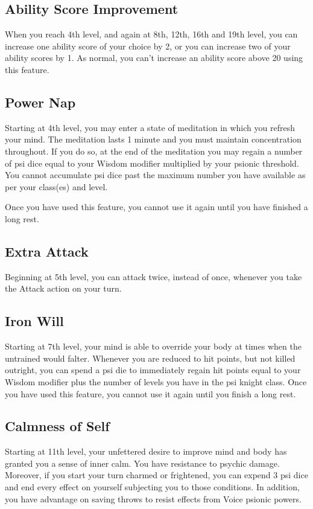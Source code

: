 \subsection{Ability Score Improvement}
When you reach 4th level,
and again at 8th, 12th, 16th and 19th level,
you can increase one ability score of your choice by 2,
or you can increase two of your ability scores by 1.
As normal,
you can't increase an ability score above 20 using this feature.

\subsection{Power Nap}
Starting at 4th level,
you may enter a state of meditation
in which you refresh your mind.
The meditation lasts 1 minute and
you must maintain concentration throughout.
If you do so,
at the end of the meditation you may regain a number of psi dice
equal to your Wisdom modifier multiplied by your psionic threshold.
You cannot accumulate psi dice past the maximum number you have available
as per your class(es) and level.

Once you have used this feature,
you cannot use it again until you have finished a long rest.

\subsection{Extra Attack}
Beginning at 5th level, you can attack twice,
instead of once,
whenever you take the Attack action on your turn.

\subsection{Iron Will}
Starting at 7th level,
your mind is able to override your body at times
when the untrained would falter.
Whenever you are reduced to hit points,
but not killed outright,
you can spend a psi die to immediately regain hit points
equal to your Wisdom modifier plus the number of levels
you have in the psi knight class.
Once you have used this feature,
you cannot use it again until you finish a long rest.

\subsection{Calmness of Self}
Starting at 11th level,
your unfettered desire to improve mind and body
has granted you a sense of inner calm.
You have resistance to psychic damage.
Moreover, if you start your turn charmed or frightened,
you can expend 3 psi dice and end every effect on yourself
subjecting you to those conditions.
In addition, you have advantage on saving throws to resist
effects from Voice psionic powers.

